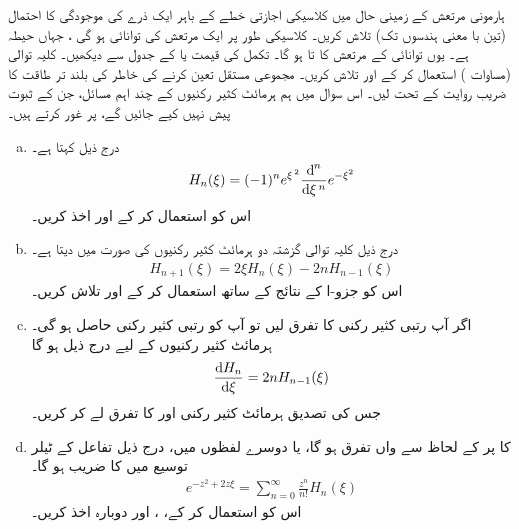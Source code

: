 ہارمونی مرتعش کے زمینی حال میں کلاسیکی اجازتی خطے  کے باہر ایک ذرے کی موجودگی کا احتمال (تین با معنی ہندسوں تک)  تلاش کریں۔
  کلاسیکی طور پر ایک مرتعش کی توانائی    ہو گی ، جہاں   حیطہ ہے۔ یوں توانائی  کے مرتعش کا   تا  ہو گا۔ تکمل کی قیمت  یا  کے  جدول سے دیکھیں۔
کلیہ توالی (مساوات )  استعمال کر کے  اور 
تلاش کریں۔ مجموعی مستقل تعین کرنے کی خاطر  کی بلند تر طاقت کا  ضریب  روایت کے تحت  لیں۔
اس سوال میں ہم ہرمائٹ کثیر رکنیوں کے چند اہم مسائل، جن کے ثبوت پیش نہیں کیے جائیں گے، پر غور کرتے ہیں۔
\begin{enumerate}[a.]
\item
{} درج ذیل کہتا ہے۔
\begin{align}
H_{n}(\xi)=(-1)^{n}e^{\xi^{\,2}}\frac{\dif^{\,n}}{\dif \xi^{\,n}}e^{-\xi^{2}}
\end{align}
اس کو استعمال کر کے  اور   اخذ کریں۔
\item
درج ذیل کلیہ توالی گزشتہ دو ہرمائٹ کثیر رکنیوں کی صورت میں   دیتا ہے۔
\begin{align}
H_{n+1}(\xi)=2\xi H_{n}(\xi)-2nH_{n-1}(\xi)
\end{align}
اس کو جزو-ا کے نتائج کے ساتھ استعمال کر کے  اور   تلاش کریں۔
\item
اگر آپ  رتبی کثیر رکنی کا تفرق لیں تو آپ کو  رتبی کثیر رکنی حاصل ہو گی۔ ہرمائٹ کثیر رکنیوں کے لیے درج ذیل ہو گا
\begin{align}
\frac{\dif{H_{n}}}{\dif{\xi}}=2nH_{n-1}(\xi)
\end{align}
جس کی تصدیق ہرمائٹ کثیر رکنی  اور   کا تفرق لے کر  کریں۔ 
\item
{}  کا  پر  کے لحاظ سے    واں تفرق  ہو گا، یا دوسرے لفظوں میں، درج ذیل تفاعل کے ٹیلر توسیع میں   کا  ضریب    ہو گا۔
\begin{align}
e^{-z^{2}+2z\xi}=\sum_{n=0}^{\infty}\frac{z^{n}}{n!}H_{n}(\xi)
\end{align}
اس کو استعمال کر کے، ،  اور  دوبارہ اخذ کریں۔
\end{enumerate}

